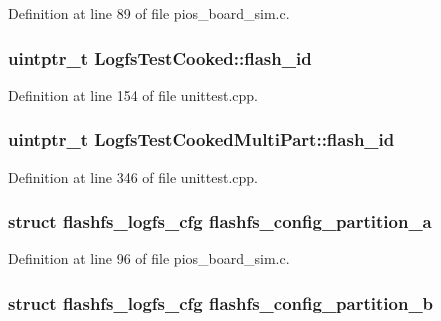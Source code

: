 Definition at line 89 of file pios\-\_\-board\-\_\-sim.\-c.

\hypertarget{group___unit_tests_ga1180d0088fd85cca978eaed59163f626}{
\subsubsection[{flash\-\_\-id}]{\setlength{\rightskip}{0pt plus 5cm}uintptr\-\_\-t Logfs\-Test\-Cooked\-::flash\-\_\-id\hspace{0.3cm}{\ttfamily [protected]}}}\label{group___unit_tests_ga1180d0088fd85cca978eaed59163f626}


Definition at line 154 of file unittest.\-cpp.

\hypertarget{group___unit_tests_ga503c4ee9ad8abab85d6fb34d0397944c}{
\subsubsection[{flash\-\_\-id}]{\setlength{\rightskip}{0pt plus 5cm}uintptr\-\_\-t Logfs\-Test\-Cooked\-Multi\-Part\-::flash\-\_\-id\hspace{0.3cm}{\ttfamily [protected]}}}\label{group___unit_tests_ga503c4ee9ad8abab85d6fb34d0397944c}


Definition at line 346 of file unittest.\-cpp.

\hypertarget{group___unit_tests_gaba5cc3d568259a61d596b4cd0c63bad8}{
\subsubsection[{flashfs\-\_\-config\-\_\-partition\-\_\-a}]{\setlength{\rightskip}{0pt plus 5cm}struct {\bf flashfs\-\_\-logfs\-\_\-cfg} flashfs\-\_\-config\-\_\-partition\-\_\-a}}\label{group___unit_tests_gaba5cc3d568259a61d596b4cd0c63bad8}


Definition at line 96 of file pios\-\_\-board\-\_\-sim.\-c.

\hypertarget{group___unit_tests_ga6d0bc62b8797aa4539687ed6b976e503}{
\subsubsection[{flashfs\-\_\-config\-\_\-partition\-\_\-b}]{\setlength{\rightskip}{0pt plus 5cm}struct {\bf flashfs\-\_\-logfs\-\_\-cfg} flashfs\-\_\-config\-\_\-partition\-\_\-b}}\label{group___unit_tests_ga6d0bc62b8797aa4539687ed6b976e503}


